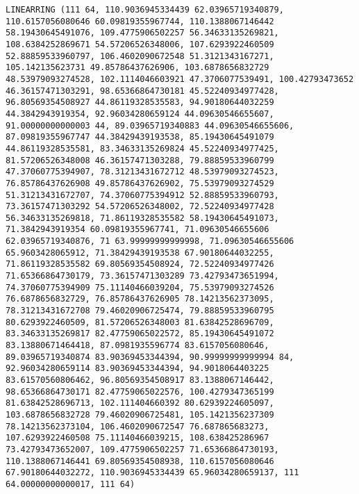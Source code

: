 \documentclass{article}
\begin{document}
    \begin{Verbatim}[commandchars=\\\{\}]
LINEARRING (111 64, 110.9036945334439 62.03965719340879, 110.6157056080646 60.09819355967744, 110.1388067146442 58.19430645491076, 109.4775906502257 56.34633135269821, 108.6384252869671 54.57206526348006, 107.6293922460509 52.88859533960797, 106.4602090672548 51.3121343167271, 105.142135623731 49.85786437626906, 103.6878656832729 48.53979093274528, 102.1114046603921 47.3706077539491, 100.42793473652 46.36157471303291, 98.65366864730181 45.52240934977428, 96.80569354508927 44.86119328535583, 94.90180644032259 44.3842943919354, 92.96034280659124 44.09630546655607, 91.00000000000003 44, 89.03965719340883 44.09630546655606, 87.09819355967747 44.38429439193538, 85.19430645491079 44.86119328535581, 83.34633135269824 45.52240934977425, 81.57206526348008 46.36157471303288, 79.88859533960799 47.37060775394907, 78.31213431672712 48.53979093274523, 76.85786437626908 49.85786437626902, 75.53979093274529 51.31213431672707, 74.37060775394912 52.88859533960793, 73.36157471303292 54.57206526348002, 72.52240934977428 56.34633135269818, 71.86119328535582 58.19430645491073, 71.3842943919354 60.09819355967741, 71.09630546655606 62.03965719340876, 71 63.99999999999998, 71.09630546655606 65.9603428065912, 71.38429439193538 67.90180644032255, 71.86119328535582 69.80569354508924, 72.52240934977426 71.65366864730179, 73.36157471303289 73.42793473651994, 74.37060775394909 75.11140466039204, 75.53979093274526 76.6878656832729, 76.85786437626905 78.14213562373095, 78.31213431672708 79.46020906725474, 79.88859533960795 80.6293922460509, 81.57206526348003 81.63842528696709, 83.34633135269817 82.47759065022572, 85.19430645491072 83.13880671464418, 87.0981935596774 83.6157056080646, 89.03965719340874 83.90369453344394, 90.99999999999994 84, 92.96034280659114 83.90369453344394, 94.9018064403225 83.61570560806462, 96.80569354508917 83.1388067146442, 98.65366864730171 82.47759065022576, 100.4279347365199 81.63842528696713, 102.111404660392 80.62939224605097, 103.6878656832728 79.46020906725481, 105.1421356237309 78.14213562373104, 106.4602090672547 76.687865683273, 107.6293922460508 75.11140466039215, 108.638425286967 73.42793473652007, 109.4775906502257 71.65366864730193, 110.1388067146441 69.80569354508938, 110.6157056080646 67.90180644032272, 110.9036945334439 65.96034280659137, 111 64.00000000000017, 111 64)

\end{Verbatim}
\end{document}
